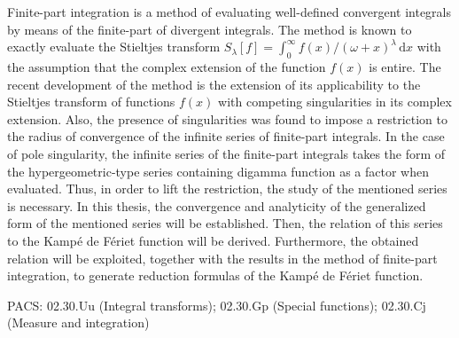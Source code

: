 Finite-part integration is a method of evaluating well-defined convergent integrals by means of the finite-part of divergent integrals. The method is known to exactly evaluate the Stieltjes transform $S_{\lambda} [f] = \int_0^\infty f(x)/(\omega + x)^{\lambda} \, \mathrm{d}x$ with the assumption that the complex extension of the function $f(x)$ is entire. The recent development of the method is the extension of its applicability to the Stieltjes transform of functions $f(x)$ with competing singularities in its complex extension. Also, the presence of singularities was found to impose a restriction to the radius of convergence of the infinite series of finite-part integrals. In the case of pole singularity, the infinite series of the finite-part integrals takes the form of the hypergeometric-type series containing digamma function as a factor when evaluated. Thus, in order to lift the restriction, the study of the mentioned series is necessary. In this thesis, the convergence and analyticity of the generalized form of the mentioned series will be established. Then, the relation of this series to the Kampé de Fériet function will be derived. Furthermore, the obtained relation will be exploited, together with the results in the method of finite-part integration, to generate reduction formulas of the Kampé de Fériet function.

\noindent PACS: 02.30.Uu (Integral transforms); 02.30.Gp (Special functions); 02.30.Cj (Measure and integration)